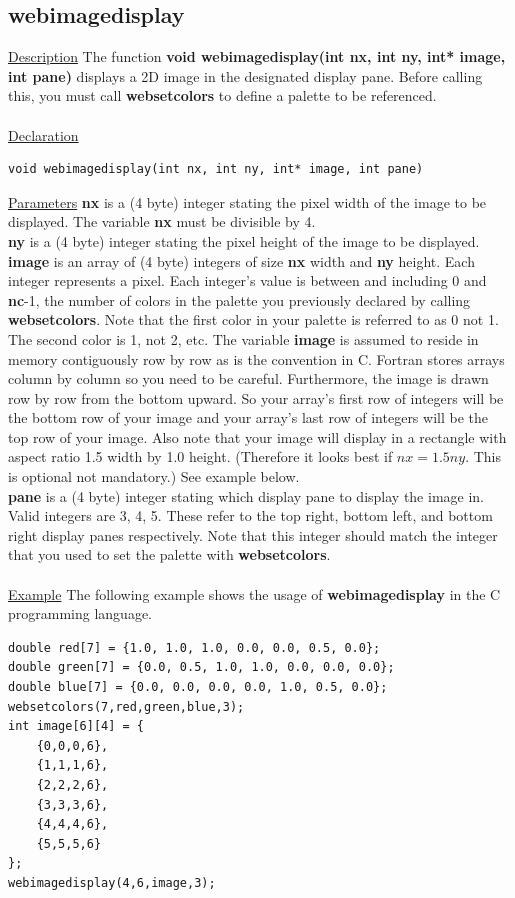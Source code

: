 \subsection{webimagedisplay}
\underline{Description} The function \textbf{void webimagedisplay(int nx, int ny, int* image, int pane)} displays a
2D image in the designated display pane. Before calling this, you must call \textbf{websetcolors} to define a palette
to be referenced.\\
\\
\underline{Declaration}
\begin{verbatim}
void webimagedisplay(int nx, int ny, int* image, int pane)
\end{verbatim}
\underline{Parameters} \textbf{nx} is a (4 byte) integer stating the pixel width of the image to be displayed. The
variable \textbf{nx} must be divisible by 4.\\
\textbf{ny} is a (4 byte) integer stating the pixel height of the image to be displayed.\\
\textbf{image} is an array of (4 byte) integers of size \textbf{nx} width and \textbf{ny} height. Each integer represents
a pixel. Each integer's value is between and including 0 and \textbf{nc}-1, the number of colors in the palette you previously 
declared by calling \textbf{websetcolors}. Note that the first color in your palette is referred to as 0 not 1. The second 
color is 1, not 2, etc. The variable \textbf{image} is assumed to reside in memory contiguously row by row as is the 
convention in C. Fortran stores arrays column by column so you need to be careful. Furthermore, the image is drawn 
row by row from the bottom upward.  So your array's first row of integers 
will be the bottom row of your image and your array's last row of integers will be the top row of your image. 
Also note that your image will display in a rectangle with aspect ratio 1.5 width by 1.0 height. (Therefore it looks best
if $nx = 1.5 ny$. This is optional not mandatory.) See example below.\\
\textbf{pane} is a (4 byte) integer stating which display pane to display the image in. Valid integers are 3, 4, 5. These
refer to the top right, bottom left, and bottom right display panes respectively. Note that this integer should match the 
integer that you used to set the palette with \textbf{websetcolors}. \\
\\
\underline{Example} The following example shows the usage of \textbf{webimagedisplay} in the C programming language.
\begin{verbatim}
double red[7] = {1.0, 1.0, 1.0, 0.0, 0.0, 0.5, 0.0};
double green[7] = {0.0, 0.5, 1.0, 1.0, 0.0, 0.0, 0.0};
double blue[7] = {0.0, 0.0, 0.0, 0.0, 1.0, 0.5, 0.0};
websetcolors(7,red,green,blue,3); 
int image[6][4] = { 
    {0,0,0,6},
    {1,1,1,6}, 
    {2,2,2,6}, 
    {3,3,3,6}, 
    {4,4,4,6},
    {5,5,5,6}
};
webimagedisplay(4,6,image,3);
\end{verbatim}
